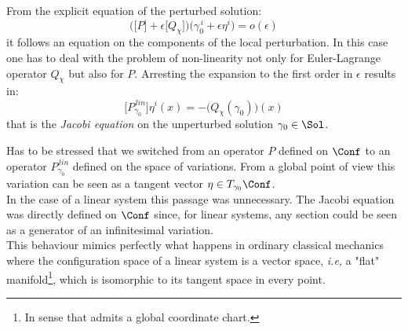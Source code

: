 \documentclass[Main]{subfiles}
\begin{document}
		\vspace{2mm}
		From the explicit equation of the perturbed solution: 
		\begin{displaymath}
			\biggr(\big[P\big] + \epsilon\big[Q_\chi\big] \biggr) \big(\gamma_0^{\,i}+\epsilon \eta^i \big) = o(\epsilon)
		\end{displaymath}
		it follows an equation on the components of the local perturbation.
		In  this case one has to deal with the problem of non-linearity not only for Euler-Lagrange operator $Q_\chi$ but also for $P$.
		Arresting the expansion to the first order in $\epsilon$ results in:
		\begin{equation}\label{PeierlJacobiEqNonLin}
			\biggr[P_{\gamma_0}^{\, lin} \biggr] \eta^i(x) = -\biggr(Q_\chi(\gamma_0)\biggr)(x)
		\end{equation}
		that is the \emph{Jacobi equation} on the unperturbed solution $\gamma_0\in \Sol$.

		\vspace{2mm}
			Has to be stressed that
			we switched from an operator $P$  defined on  $\Conf$ to an operator  $P_{\gamma_0}^{\, lin}  $ defined on the space of variations.
			From a global point of view this variation can be seen as a tangent vector $\eta \in T_{\gamma_0}\Conf$.\\
			In the case of a linear system this passage was unnecessary. The Jacobi equation was directly defined on $\Conf$ since, for linear systems, any section could be seen as a generator of an infinitesimal variation.\\
			This behaviour mimics perfectly what happens in ordinary classical mechanics where the configuration space of a linear system is a vector space, \textit{i.e,} a "flat" manifold\footnote{In sense that admits a global coordinate chart.}, which is isomorphic to its tangent space in every point.
\end{document}
